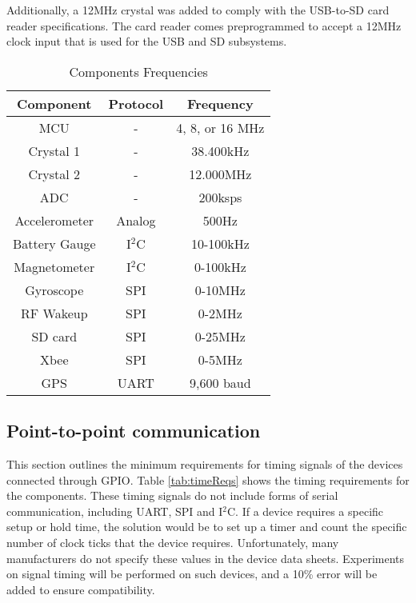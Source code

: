 Additionally, a 12MHz crystal was added to comply with the USB-to-SD card reader specifications. The card reader comes preprogrammed to accept a 12MHz clock input that is used for the USB and SD subsystems.

\begin{table}[H]
  \centering
  \caption{Components Frequencies}
    \begin{tabular}{|c|c|c|}
    \hline
    Component & Protocol & Frequency \\
    \hline \hline
    MCU   & -     & 4, 8, or 16 MHz \\ \hline
    Crystal 1 & -     & 38.400kHz \\ \hline
    Crystal 2 & -     & 12.000MHz \\ \hline
    ADC   & -     & 200ksps \\ \hline
    Accelerometer & Analog & 500Hz \\ \hline
    Battery Gauge & I$^2$C & 10-100kHz \\ \hline
    Magnetometer & I$^2$C & 0-100kHz \\ \hline
    Gyroscope & SPI   & 0-10MHz \\ \hline
    RF Wakeup & SPI   & 0-2MHz \\ \hline
    SD card & SPI   & 0-25MHz \\ \hline
    Xbee  & SPI   & 0-5MHz \\ \hline
    GPS   & UART  & 9,600 baud \\ \hline
    \end{tabular}%
  \label{tab:compFreq}%
\end{table}%

\subsection{Point-to-point communication}
This section outlines the minimum requirements for timing signals of the devices connected through GPIO. Table \ref{tab:timeReqs} shows the timing requirements for the components. These timing signals do not include forms of serial communication, including UART, SPI and I$^2$C. If a device requires a specific setup or hold time, the solution would be to set up a timer and count the specific number of clock ticks that the device requires. Unfortunately, many manufacturers do not specify these values in the device data sheets. Experiments on signal timing will be performed on such devices, and a 10\% error will be added to ensure compatibility.

